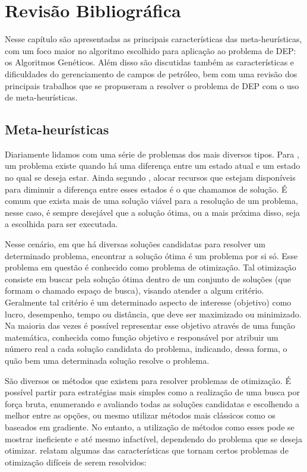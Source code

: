 \chapter{Revisão Bibliográfica}
\label{ch:ch2}
Nesse capítulo são apresentadas as principais características das meta-heurísticas, com um foco maior no algoritmo escolhido para aplicação ao problema de DEP: os Algoritmos Genéticos. Além disso são discutidas também as características e dificuldades do gerenciamento de campos de petróleo, bem com uma revisão dos principais trabalhos que se propuseram a resolver o problema de DEP com o uso de meta-heurísticas.

\section{Meta-heurísticas}
\label{sec:section21}
Diariamente lidamos com uma série de problemas dos mais diversos tipos. Para , um problema existe quando há uma diferença entre um estado atual e um estado no qual se deseja estar. Ainda segundo , alocar recursos que estejam disponíveis para diminuir a diferença entre esses estados é o que chamamos de solução. É comum que exista mais de uma solução viável para a resolução de um problema, nesse caso, é sempre desejável que a solução ótima, ou a mais próxima disso, seja a escolhida para ser executada.

Nesse cenário, em que há diversas soluções candidatas para resolver um determinado problema, encontrar a solução ótima é um problema por si só. Esse problema em questão é conhecido como problema de otimização.  Tal otimização consiste em buscar pela solução ótima dentro de um conjunto de soluções (que formam o chamado espaço de busca), visando atender a algum critério. Geralmente tal critério é um determinado aspecto de interesse (objetivo) como lucro, desempenho, tempo ou distância, que deve ser maximizado ou minimizado. Na maioria das vezes é possível representar esse objetivo através de uma função matemática, conhecida como função objetivo e responsável por atribuir um número real a cada solução candidata do problema, indicando, dessa forma, o quão bem uma determinada solução resolve o problema.

São diversos os métodos que existem para resolver problemas de otimização. É possível partir para estratégias mais simples como a realização de uma busca por força bruta, enumerando e avaliando todas as soluções candidatas e escolhendo a melhor entre as opções, ou mesmo utilizar métodos mais clássicos como os baseados em gradiente. No entanto, a utilização de métodos como esses pode se mostrar ineficiente e até mesmo infactível, dependendo do problema que se deseja otimizar.  relatam algumas das características que tornam certos problemas de otimização difíceis de serem resolvidos:

